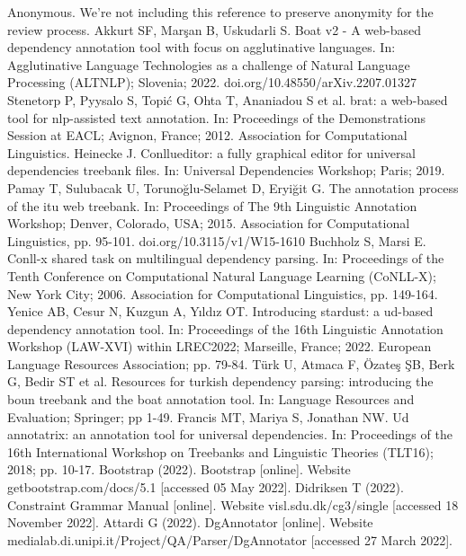 \begin{thebibliography}{99}
 Anonymous. We're not including this reference to preserve anonymity for the review process.
 Akkurt SF, Marşan B, Uskudarli S. Boat v2 - A web-based dependency annotation tool with focus on agglutinative languages. In: Agglutinative Language Technologies as a challenge of Natural Language Processing (ALTNLP); Slovenia; 2022. doi.org/10.48550/arXiv.2207.01327
 Stenetorp P, Pyysalo S, Topi\'{c} G, Ohta T, Ananiadou S et al. brat: a web-based tool for nlp-assisted text annotation. In: Proceedings of the Demonstrations Session at EACL; Avignon, France; 2012. Association for Computational Linguistics.
 Heinecke J. Conllueditor: a fully graphical editor for universal dependencies treebank files. In: Universal Dependencies Workshop; Paris; 2019.
 Pamay T, Sulubacak U, Toruno{\u{g}}lu-Selamet D, Eryi{\u{g}}it G. The annotation process of the itu web treebank. In: Proceedings of The 9th Linguistic Annotation Workshop; Denver, Colorado, USA; 2015. Association for Computational Linguistics, pp. 95-101. doi.org/10.3115/v1/W15-1610
 Buchholz S, Marsi E. Conll-x shared task on multilingual dependency parsing. In: Proceedings of the Tenth Conference on Computational Natural Language Learning (CoNLL-X); New York City; 2006. Association for Computational Linguistics, pp. 149-164.
 Yenice AB, Cesur N, Kuzgun A, Y{\i}ld{\i}z OT. Introducing stardust: a ud-based dependency annotation tool. In: Proceedings of the 16th Linguistic Annotation Workshop (LAW-XVI) within LREC2022; Marseille, France; 2022. European Language Resources Association; pp. 79-84.
 T{\"u}rk U, Atmaca F, {\"O}zate{\c{s}} {\c{S}}B, Berk G, Bedir ST et al. Resources for turkish dependency parsing: introducing the boun treebank and the boat annotation tool. In: Language Resources and Evaluation; Springer; pp 1-49.
 Francis MT, Mariya S, Jonathan NW. Ud annotatrix: an annotation tool for universal dependencies. In: Proceedings of the 16th International Workshop on Treebanks and Linguistic Theories (TLT16); 2018; pp. 10-17.
 Bootstrap (2022). Bootstrap [online]. Website getbootstrap.com/docs/5.1 [accessed 05 May 2022].
 Didriksen T (2022). Constraint Grammar Manual [online]. Website visl.sdu.dk/cg3/single [accessed 18 November 2022].
 Attardi G (2022). {DgAnnotator} [online]. Website medialab.di.unipi.it/Project/QA/Parser/DgAnnotator [accessed 27 March 2022].

\end{thebibliography}
